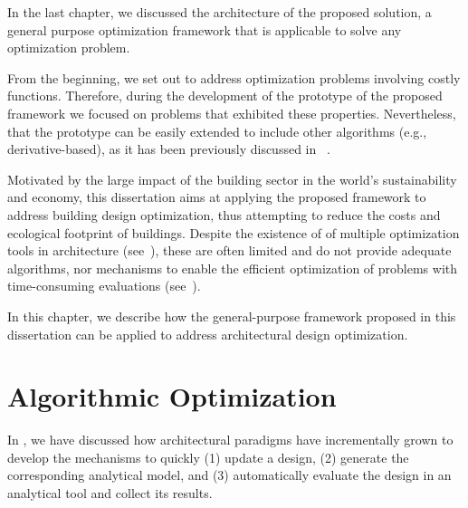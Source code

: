 \cleardoublepage
\label{chap:implement}

In the last chapter, we discussed the architecture of the proposed solution, a general purpose optimization framework that is applicable to solve any optimization problem. 

From the beginning, we set out to address optimization problems involving costly functions. Therefore, during the development of the prototype of the proposed framework we focused on problems that exhibited these properties. Nevertheless, that the prototype can be easily extended to include other algorithms (e.g., derivative-based), as it has been previously discussed in ~. 

Motivated by the large impact of the building sector in the world's sustainability and economy, this dissertation aims at applying the proposed framework to address building design optimization, thus attempting to reduce the costs and ecological footprint of buildings. Despite the existence of of multiple optimization tools in architecture (see~), these are often limited and do not provide adequate algorithms, nor mechanisms to enable the efficient optimization of problems with time-consuming evaluations (see~).

In this chapter, we describe how the general-purpose framework proposed in this dissertation can be applied to address architectural design optimization. 

\section{Algorithmic Optimization}

In , we have discussed how architectural paradigms have incrementally grown to develop the mechanisms to quickly (1) update a design, (2) generate the corresponding analytical model, and (3) automatically evaluate the design in an analytical tool and collect its results. 

